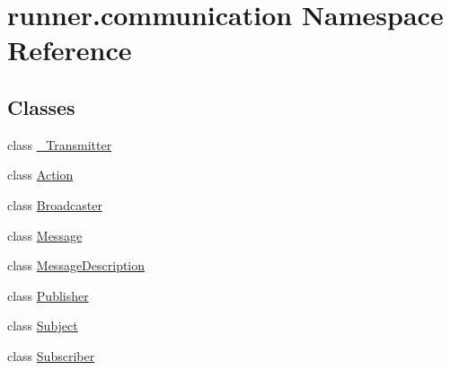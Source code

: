 \hypertarget{namespacerunner_1_1communication}{}\section{runner.\+communication Namespace Reference}
\label{namespacerunner_1_1communication}
\subsection*{Classes}
\begin{DoxyCompactItemize}
\item 
class \hyperlink{classrunner_1_1communication_1_1__Transmitter}{\+\_\+\+Transmitter}
\item 
class \hyperlink{classrunner_1_1communication_1_1Action}{Action}
\item 
class \hyperlink{classrunner_1_1communication_1_1Broadcaster}{Broadcaster}
\item 
class \hyperlink{classrunner_1_1communication_1_1Message}{Message}
\item 
class \hyperlink{classrunner_1_1communication_1_1MessageDescription}{Message\+Description}
\item 
class \hyperlink{classrunner_1_1communication_1_1Publisher}{Publisher}
\item 
class \hyperlink{classrunner_1_1communication_1_1Subject}{Subject}
\item 
class \hyperlink{classrunner_1_1communication_1_1Subscriber}{Subscriber}
\end{DoxyCompactItemize}
